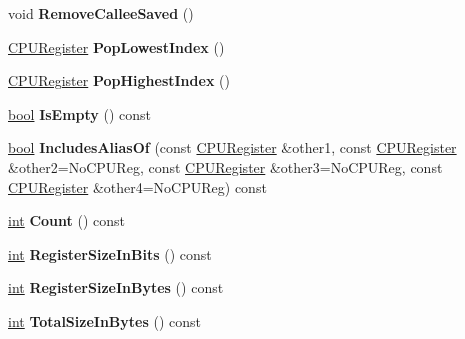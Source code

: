 \begin{DoxyCompactItemize}
void {\bfseries Remove\+Callee\+Saved} ()
\item 
\mbox{\label{classv8_1_1internal_1_1CPURegList_a867b629b4d0a55fe464cf3c2daca8d3c}} 
\mbox{\hyperlink{classv8_1_1internal_1_1CPURegister}{C\+P\+U\+Register}} {\bfseries Pop\+Lowest\+Index} ()
\item 
\mbox{\label{classv8_1_1internal_1_1CPURegList_a4f0b78f3f4844b520caba599d0860d81}} 
\mbox{\hyperlink{classv8_1_1internal_1_1CPURegister}{C\+P\+U\+Register}} {\bfseries Pop\+Highest\+Index} ()
\item 
\mbox{\label{classv8_1_1internal_1_1CPURegList_aa3d6f939b0dc9592857fface92e906f6}} 
\mbox{\hyperlink{classbool}{bool}} {\bfseries Is\+Empty} () const
\item 
\mbox{\label{classv8_1_1internal_1_1CPURegList_a2200a74ac7aa0da8ce2615611ee11609}} 
\mbox{\hyperlink{classbool}{bool}} {\bfseries Includes\+Alias\+Of} (const \mbox{\hyperlink{classv8_1_1internal_1_1CPURegister}{C\+P\+U\+Register}} \&other1, const \mbox{\hyperlink{classv8_1_1internal_1_1CPURegister}{C\+P\+U\+Register}} \&other2=No\+C\+P\+U\+Reg, const \mbox{\hyperlink{classv8_1_1internal_1_1CPURegister}{C\+P\+U\+Register}} \&other3=No\+C\+P\+U\+Reg, const \mbox{\hyperlink{classv8_1_1internal_1_1CPURegister}{C\+P\+U\+Register}} \&other4=No\+C\+P\+U\+Reg) const
\item 
\mbox{\label{classv8_1_1internal_1_1CPURegList_a64a13a8c487091609c6793c8c05b6a36}} 
\mbox{\hyperlink{classint}{int}} {\bfseries Count} () const
\item 
\mbox{\label{classv8_1_1internal_1_1CPURegList_a7809c7a86ce6c328904201c843f388b0}} 
\mbox{\hyperlink{classint}{int}} {\bfseries Register\+Size\+In\+Bits} () const
\item 
\mbox{\label{classv8_1_1internal_1_1CPURegList_aa0df366caace6282423214a6778ac287}} 
\mbox{\hyperlink{classint}{int}} {\bfseries Register\+Size\+In\+Bytes} () const
\item 
\mbox{\label{classv8_1_1internal_1_1CPURegList_a403223596499cd9a8135a3196007ade1}} 
\mbox{\hyperlink{classint}{int}} {\bfseries Total\+Size\+In\+Bytes} () const
\end{DoxyCompactItemize}
